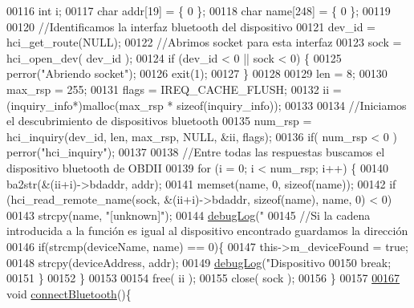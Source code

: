 \begin{DoxyCode}
{{00116         \textcolor{keywordtype}{int} i;
00117         \textcolor{keywordtype}{char} addr[19] = \{ 0 \};
00118         \textcolor{keywordtype}{char} name[248] = \{ 0 \};
00119 
00120         \textcolor{comment}{//Identificamos la interfaz bluetooth del dispositivo}
00121         dev\_id = hci\_get\_route(NULL);
00122         \textcolor{comment}{//Abrimos socket para esta interfaz}
00123         sock = hci\_open\_dev( dev\_id );
00124         \textcolor{keywordflow}{if} (dev\_id < 0 || sock < 0) \{
00125             perror(\textcolor{stringliteral}{"Abriendo socket"});
00126             exit(1);
00127         \}
00128 
00129         len  = 8;
00130         max\_rsp = 255;
00131         flags = IREQ\_CACHE\_FLUSH;
00132         ii = (inquiry\_info*)malloc(max\_rsp * \textcolor{keyword}{sizeof}(inquiry\_info));
00133 
00134         \textcolor{comment}{//Iniciamos el descubrimiento de dispositivos bluetooth}
00135         num\_rsp = hci\_inquiry(dev\_id, len, max\_rsp, NULL, &ii, flags);
00136         \textcolor{keywordflow}{if}( num\_rsp < 0 ) perror(\textcolor{stringliteral}{"hci\_inquiry"});
00137 
00138         \textcolor{comment}{//Entre todas las respuestas buscamos el dispositivo bluetooth de OBDII}
00139         \textcolor{keywordflow}{for} (i = 0; i < num\_rsp; i++) \{
00140             ba2str(&(ii+i)->bdaddr, addr);
00141             memset(name, 0, \textcolor{keyword}{sizeof}(name));
00142             \textcolor{keywordflow}{if} (hci\_read\_remote\_name(sock, &(ii+i)->bdaddr, \textcolor{keyword}{sizeof}(name), name, 0) < 0)
00143                 strcpy(name, \textcolor{stringliteral}{"[unknown]"});
00144             \hyperlink{debug_8hpp_a55f41cf7b0585224496de3d7adbc101c}{debugLog}(\textcolor{stringliteral}{"%
00145             \textcolor{comment}{//Si la cadena introducida a la función es igual al dispositivo encontrado guardamos la
       dirección}
00146             \textcolor{keywordflow}{if}(strcmp(deviceName, name) == 0)\{
00147                 this->m\_deviceFound = \textcolor{keyword}{true};
00148                 strcpy(deviceAddress, addr);
00149                 \hyperlink{debug_8hpp_a55f41cf7b0585224496de3d7adbc101c}{debugLog}(\textcolor{stringliteral}{"Dispositivo %
00150                 \textcolor{keywordflow}{break};
00151             \}
00152         \}
00153 
00154         free( ii );
00155         close( sock );
00156     \}   
00157 
\hyperlink{classObd_a104ccc3f2e0a4a103ae4cd1daa2f64d8}{00167}     \textcolor{keywordtype}{void} \hyperlink{classObd_a104ccc3f2e0a4a103ae4cd1daa2f64d8}{connectBluetooth}()\{
}}}}
\end{DoxyCode}
